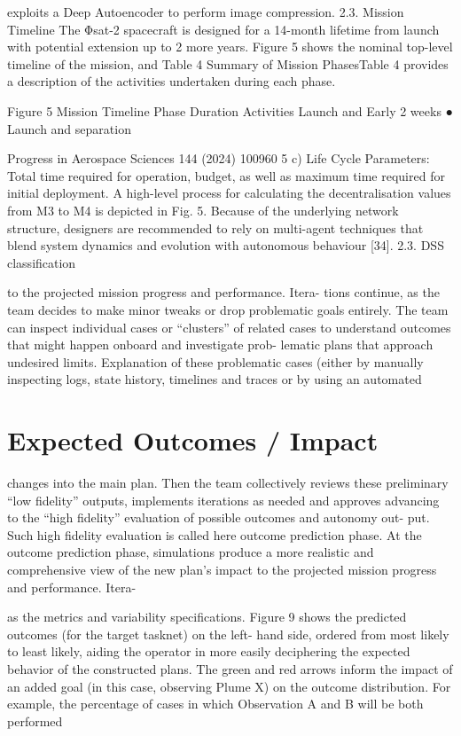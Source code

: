 \documentclass[a4paper,12pt]{article}
\begin{document}
exploits a Deep Autoencoder to perform image compression. 
2.3. Mission Timeline 
The Φsat-2 spacecraft is designed for a 14-month lifetime from launch with potential extension 
up to 2 more years. Figure 5 shows the nominal top-level timeline of the mission, and Table 4 
Summary of Mission PhasesTable 4 provides a description of the activities undertaken during 
each phase. 
 
Figure 5  Mission Timeline 
Phase 
Duration 
Activities 
Launch and Early 
2 weeks 
● Launch and separation

Progress in Aerospace Sciences 144 (2024) 100960
5
c) Life Cycle Parameters: Total time required for operation, budget, as 
well as maximum time required for initial deployment. 
A high-level process for calculating the decentralisation values from 
M3 to M4 is depicted in Fig. 5. Because of the underlying network 
structure, designers are recommended to rely on multi-agent techniques 
that blend system dynamics and evolution with autonomous behaviour 
[34]. 
2.3. DSS classification

to the projected mission progress and performance. Itera-
tions continue, as the team decides to make minor tweaks
or drop problematic goals entirely.
The team can inspect
individual cases or “clusters” of related cases to understand
outcomes that might happen onboard and investigate prob-
lematic plans that approach undesired limits. Explanation of
these problematic cases (either by manually inspecting logs,
state history, timelines and traces or by using an automated

\section{Expected Outcomes / Impact}

changes into the main plan.
Then the team collectively
reviews these preliminary “low ﬁdelity” outputs, implements
iterations as needed and approves advancing to the “high
ﬁdelity” evaluation of possible outcomes and autonomy out-
put.
Such high ﬁdelity evaluation is called here outcome
prediction phase.
At the outcome prediction phase, simulations produce a more
realistic and comprehensive view of the new plan’s impact
to the projected mission progress and performance. Itera-

as the metrics and variability speciﬁcations. Figure 9 shows
the predicted outcomes (for the target tasknet) on the left-
hand side, ordered from most likely to least likely, aiding the
operator in more easily deciphering the expected behavior of
the constructed plans. The green and red arrows inform the
impact of an added goal (in this case, observing Plume X)
on the outcome distribution. For example, the percentage of
cases in which Observation A and B will be both performed
\end{document}
